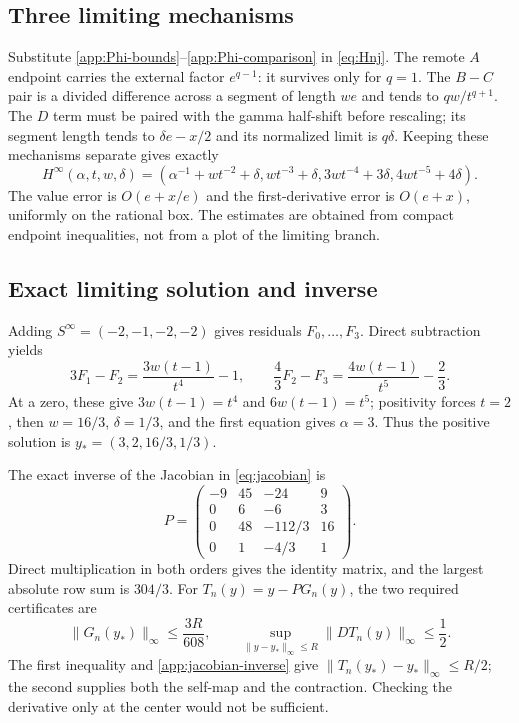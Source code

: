 \subsection{Three limiting mechanisms}

Substitute \eqref{app:Phi-bounds}--\eqref{app:Phi-comparison} in
\eqref{eq:Hnj}.  The remote $A$ endpoint carries the external factor
$e^{q-1}$: it survives only for $q=1$.  The $B-C$ pair is a divided
difference across a segment of length $we$ and tends to $qw/t^{q+1}$.
The $D$ term must be paired with the gamma half-shift before rescaling; its
segment length tends to $\delta e-x/2$ and its normalized limit is
$q\delta$.  Keeping these mechanisms separate gives exactly
\[
 H^\infty(\alpha,t,w,\delta)=
 \left(\alpha^{-1}+wt^{-2}+\delta,
 wt^{-3}+\delta,3wt^{-4}+3\delta,4wt^{-5}+4\delta\right).
\]
The value error is $O(e+x/e)$ and the first-derivative error is $O(e+x)$,
uniformly on the rational box.  The estimates are obtained from compact
endpoint inequalities, not from a plot of the limiting branch.

\subsection{Exact limiting solution and inverse}

Adding $S^\infty=(-2,-1,-2,-2)$ gives residuals $F_0,\ldots,F_3$.  Direct
subtraction yields
\[
 3F_1-F_2=\frac{3w(t-1)}{t^4}-1,
 \qquad
 \frac43F_2-F_3=\frac{4w(t-1)}{t^5}-\frac23.
\]
At a zero, these give $3w(t-1)=t^4$ and $6w(t-1)=t^5$; positivity forces
$t=2$, then
$w=16/3$, $\delta=1/3$, and the first equation gives $\alpha=3$.  Thus the
positive solution is $y_*=(3,2,16/3,1/3)$.

The exact inverse of the Jacobian in \eqref{eq:jacobian} is
\begin{equation}\label{app:jacobian-inverse}
 P=
 \begin{pmatrix}
 -9&45&-24&9\\
 0&6&-6&3\\
 0&48&-112/3&16\\
 0&1&-4/3&1
 \end{pmatrix}.
\end{equation}
Direct multiplication in both orders gives the identity matrix, and the
largest absolute row sum is $304/3$.  For $T_n(y)=y-PG_n(y)$, the two
required certificates are
\begin{equation}\label{app:branch-certificates}
 \|G_n(y_*)\|_\infty\le\frac{3R}{608},\qquad
 \sup_{\|y-y_*\|_\infty\le R}\|DT_n(y)\|_\infty\le\frac12.
\end{equation}
The first inequality and \eqref{app:jacobian-inverse} give
$\|T_n(y_*)-y_*\|_\infty\le R/2$; the second supplies both the self-map and
the contraction.  Checking the derivative only at the center would not be
sufficient.


